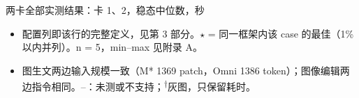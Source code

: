 
\begin{frame}[t]{两卡全部实测结果：卡 1、2，稳态中位数，秒}
\scriptsize\def\codesize{\relax}
\renewcommand{\arraystretch}{1.12}\setlength{\tabcolsep}{3pt}

\vspace{3pt}
\begin{itemize}\scriptsize\setlength\itemsep{0pt}
  \item 配置列即该行的完整定义，见第 3 部分。$\star$ = 同一框架内该 case 的最佳（1\% 以内并列）。n = 5，min--max 见附录 A。
  \item 图生文两边输入规模一致（M* 1369 patch，Omni 1386 token）；图像编辑两边指令相同。--：未测或不支持；\textsuperscript{†}灰图，只保留耗时。
\end{itemize}
\end{frame}

\newcommand{\barpair}[6]{%
    \pgfmathsetmacro{\mx}{max(#3,#4)}
    \pgfmathsetmacro{\wm}{#3/\mx*6.6}
    \pgfmathsetmacro{\wo}{#4/\mx*6.6}
    \node[anchor=east,text width=3.6cm,align=right,font=\scriptsize\bfseries] at (3.7,#1-0.34) {#2};
    \fill[Teal] (3.9,#1-0.04) rectangle ++(\wm,-0.28);
    \node[anchor=west,font=\tiny] at (3.95+\wm,#1-0.18) {#3\,s\ \textcolor{Muted}{#5}};
    \fill[Orange] (3.9,#1-0.36) rectangle ++(\wo,-0.28);
    \node[anchor=west,font=\tiny] at (3.95+\wo,#1-0.50) {#4\,s\ \textcolor{Muted}{#6}};}

